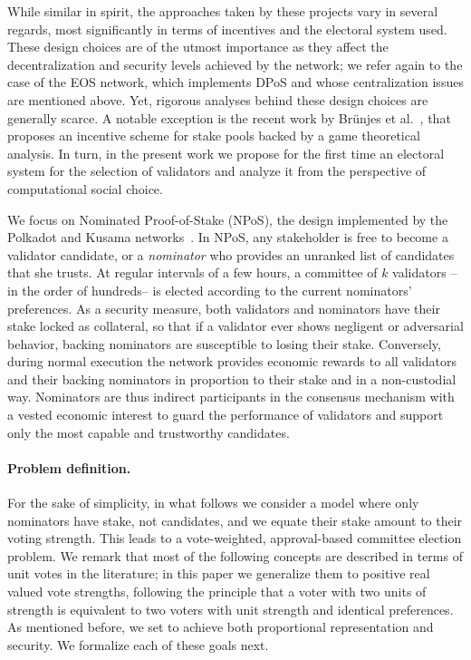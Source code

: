 While similar in spirit, the approaches taken by these projects vary in several regards, most significantly in terms of incentives and the electoral system used. These design choices are of the utmost importance as they affect the decentralization and security levels achieved by the network; we refer again to the case of the EOS network, which implements DPoS and whose centralization issues are mentioned above. 
Yet, rigorous analyses behind these design choices are generally scarce. 
A notable exception is the recent work by Br{\"u}njes et al.~\cite{brunjes2020reward}, that proposes an incentive scheme for stake pools backed by a game theoretical analysis. In turn, in the present work we propose for the first time an electoral system for the selection of validators and analyze it from the perspective of computational social choice. 

We focus on Nominated Proof-of-Stake (NPoS), the design implemented by the Polkadot and Kusama networks~\cite{burdges2020overview}. In NPoS, any stakeholder is free to become a validator candidate, or a \emph{nominator} who provides an unranked list of candidates that she trusts. At regular intervals of a few hours, a committee of $k$ validators --in the order of hundreds-- is elected according to the current nominators' preferences. 
As a security measure, both validators and nominators have their stake locked as collateral, so that if a validator ever shows negligent or adversarial behavior, backing nominators are susceptible to losing their stake. Conversely, during normal execution the network provides economic rewards to all validators and their backing nominators in proportion to their stake and in a non-custodial way. Nominators are thus indirect participants in the consensus mechanism with a vested economic interest to guard the performance of validators and support only the most capable and trustworthy candidates.

\paragraph{Problem definition.}
For the sake of simplicity, in what follows we consider a model where only nominators have stake, not candidates, and we equate their stake amount to their voting strength. This leads to a vote-weighted, approval-based committee election problem. 
We remark that most of the following concepts are described in terms of unit votes in the literature; in this paper we generalize them to positive real valued vote strengths, following the principle that a voter with two units of strength is equivalent to two voters with unit strength and identical preferences. 
As mentioned before, we set to achieve both proportional representation and security. We formalize each of these goals next. 

